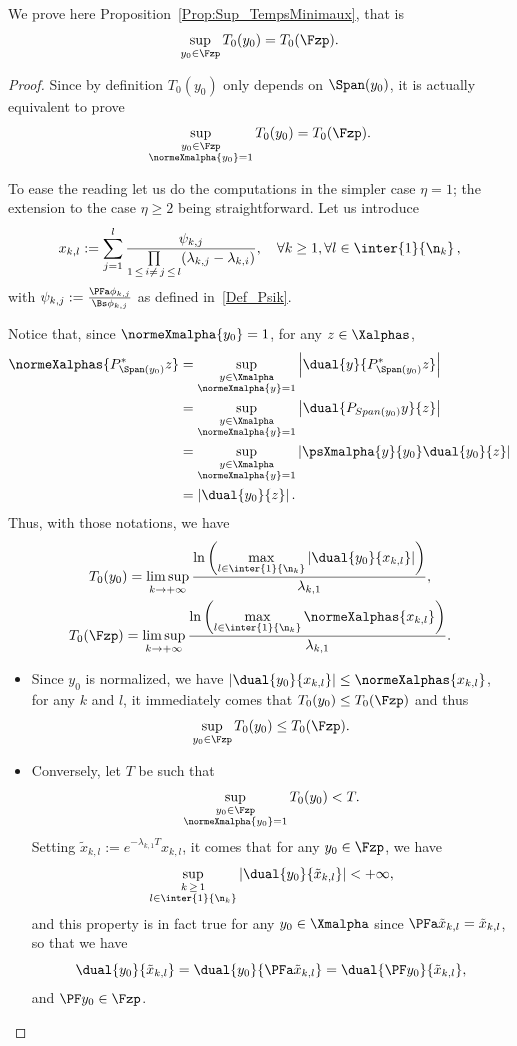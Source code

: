 We prove here Proposition~\ref{Prop:Sup_TempsMinimaux}, that is
\[
\sup_{y_0\in \Fzp} T_{0}(y_0) = T_{0}(\Fzp).
\]
\begin{proof}
Since by definition $T_0(y_0)$ only depends on $\Span(y_0)$, it is actually equivalent to prove
\[
\sup_{\substack{y_0\in \Fzp \\ \normeXmalpha{y_0}=1}} T_{0}(y_0) = T_{0}(\Fzp).
\]

To ease the reading let us do the computations in the simpler case $\eta=1$; the extension to the case $\eta \geq 2$ being straightforward. Let us introduce
\[
x_{k,l} := \sum\limits_{j=1}^l \frac{\psi_{k,j} }{\prod\limits_{1\,\leq\,i \neq\,j\,\leq\,l} (\lambda_{k,j}-\lambda_{k,i})},\quad \forall k\geq 1, \forall l\in \inter{1}{\n_k}\,,
\]
with $\psi_{k,j} := \frac{\PFa \phi_{k,j}}{\Bs \phi_{k,j}}$ as defined in~\eqref{Def_Psik}.



Notice that, since $\normeXmalpha{y_0} =1$, for any $z \in \Xalphas$,
\begin{align*}
\normeXalphas{ P_{\Span(y_0)}^* z } &= \sup\limits_{ \substack{ y \in \Xmalpha \\ \normeXmalpha{y}=1 } } \left| \dual{y}{P_{\Span(y_0)}^*z} \right|
\\
&= \sup\limits_{ \substack{ y \in \Xmalpha \\ \normeXmalpha{y}=1 } } \left| \dual{P_{Span(y_0)}y}{z} \right|
\\
&= \sup\limits_{ \substack{ y \in \Xmalpha \\ \normeXmalpha{y}=1 } } \left| \psXmalpha{y}{y_0} \dual{y_0}{z} \right|
\\
&= \left| \dual{y_0}{z} \right|.
\end{align*}
Thus, with those notations, we have
\begin{gather*}
T_0(y_0) = \limsup_{k\to+\infty} \frac{\ln \left(\max\limits_{l\in \inter{1}{\n_k}} \left| \dual{y_0}{x_{k,l}} \right| \right)}{\lambda_{k,1}},
\\
T_0(\Fzp) = \limsup_{k\to+\infty} \frac{\ln \left(\max\limits_{l\in \inter{1}{\n_k}} \normeXalphas{x_{k,l}} \right)}{\lambda_{k,1}}.
\end{gather*}
\begin{itemize}
\item Since $y_0$ is normalized, we have $\left|\dual{y_0}{x_{k,l}} \right| \leq \normeXalphas{x_{k,l}}$, for any $k$ and $l$, it immediately comes that $T_0(y_0)\leq T_0(\Fzp)$ and thus
\[
\sup_{y_0 \in \Fzp} T_0(y_0) \leq T_0(\Fzp).
\]
\item Conversely, let $T$ be such that
\[
\sup_{\substack{y_0\in \Fzp \\ \normeXmalpha{y_0}=1}} T_0(y_0) < T.
\]
Setting $\tilde{x}_{k,l} := e^{-\lambda_{k,1} T} x_{k,l}$, it comes that for any $y_0 \in \Fzp$, we have
\[
\sup_{\substack{k\,\geq\,1 \\ l\in \inter{1}{\n_k}}} \left| \dual{y_0}{\tilde{x}_{k,l}} \right| < + \infty,
\]
and this property is in fact true for any $y_0\in \Xmalpha$ since $\PFa \tilde{x}_{k,l} = \tilde{x}_{k,l}$, so that we have
\[
\dual{y_0}{\tilde{x}_{k,l}} = \dual{y_0}{\PFa \tilde{x}_{k,l}} = \dual{\PF y_0}{ \tilde{x}_{k,l}},
\]
and $\PF y_0\in \Fzp$.


\end{itemize}
\end{proof}
